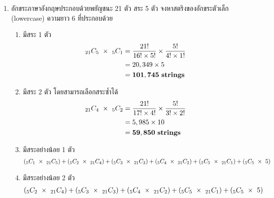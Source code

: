 \documentclass{article}
\begin{document}
\begin{enumerate}
\begin{enumerate}
	\end{enumerate}
	
	\item อักขระภาษาอังกฤษประกอบด้วยพยัญชนะ 21 ตัว สระ 5 ตัว จงหาสตริงของอักขระตัวเล็ก (lowercase)\newline
	ความยาว 6 ที่ประกอบด้วย
	\begin{enumerate}
		\item มีสระ 1 ตัว
		\begin{equation}
		\begin{split}
		_{21}C_{5} ~\times~ _{5}C_{1} &= \frac{21!}{16! \times 5!} \times \frac{5!}{4! \times 1!} \notag\\
		&= 20,349 \times 5 \\
		&=  \mathbf{101,745~strings}
		\end{split}
		\end{equation}
		
		\item มีสระ 2 ตัว โดยสามารถเลือกสระซ้ำได้
		\begin{equation}
		\begin{split}
		_{21}C_{4} ~\times~ _{5}C_{2} &= \frac{21!}{17! \times 4!} \times \frac{5!}{3! \times 2!} \notag\\
		&= 5,985 \times 10 \\
		&=  \mathbf{59,850~strings}
		\end{split}
		\end{equation}
		
		\item มีสระอย่างน้อย 1 ตัว
		\begin{equation}
		\begin{split}
		 (_5C_1 ~\times~ _{21}C_5) + (_5C_2 ~\times~ _{21}C_4) + (_5C_3 ~\times~ _{21}C_3) + (_5C_4 ~\times~ _{21}C_2) + (_5C_5 ~\times~ _{21}C_1) + (_5C_5 ~\times~ 5) \notag \\
		\end{split}
		\end{equation}
		
		\item มีสระอย่างน้อย 2 ตัว
		\begin{equation}
		\begin{split}
		 (_5C_2 ~\times~ _{21}C_4) + (_5C_3 ~\times~ _{21}C_3) + (_5C_4 ~\times~ _{21}C_2) + (_5C_5 ~\times~ _{21}C_1) + (_5C_5 ~\times~ 5) \notag \\
		\end{split}
		\end{equation}
	\end{enumerate}
	

\end{enumerate}
\end{document}
